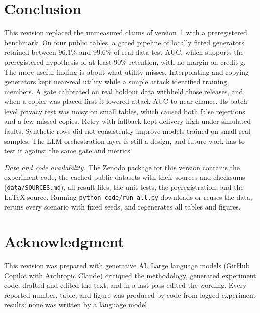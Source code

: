\documentclass[journal]{IEEEtran}
\begin{document}
\section{Conclusion}
\label{sec:conclusion}
This revision replaced the unmeasured claims of version~1 with a preregistered benchmark. On four public tables, a gated pipeline of locally fitted generators retained between 96.1\% and 99.6\% of real-data test AUC, which supports the preregistered hypothesis of at least 90\% retention, with no margin on credit-g. The more useful finding is about what utility misses. Interpolating and copying generators kept near-real utility while a simple attack identified training members. A gate calibrated on real holdout data withheld those releases, and when a copier was placed first it lowered attack AUC to near chance. Its batch-level privacy test was noisy on small tables, which caused both false rejections and a few missed copies. Retry with fallback kept delivery high under simulated faults. Synthetic rows did not consistently improve models trained on small real samples. The LLM orchestration layer is still a design, and future work has to test it against the same gate and metrics.

\emph{Data and code availability.} The Zenodo package for this version contains the experiment code, the cached public datasets with their sources and checksums (\texttt{data/SOURCES.md}), all result files, the unit tests, the preregistration, and the \LaTeX{} source. Running \texttt{python code/run\_all.py} downloads or reuses the data, reruns every scenario with fixed seeds, and regenerates all tables and figures.

\section*{Acknowledgment}
This revision was prepared with generative AI. Large language models (GitHub Copilot with Anthropic Claude) critiqued the methodology, generated experiment code, drafted and edited the text, and in a last pass edited the wording. Every reported number, table, and figure was produced by code from logged experiment results; none was written by a language model.



\end{document}
